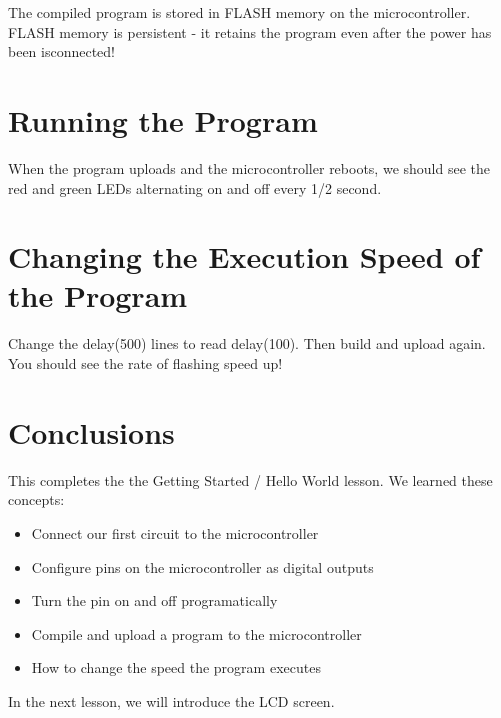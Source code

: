 \documentclass{article}
\begin{document}
The compiled program is stored in FLASH memory on the microcontroller.  FLASH 
memory is persistent - it retains the program even after the power has been 
isconnected!

\vspace{3mm}

\section*{Running the Program}

When the program uploads and the microcontroller reboots, we should see the red 
and green LEDs alternating on and off every 1/2 second.

\vspace{3mm}

\section*{Changing the Execution Speed of the Program}

Change the delay(500) lines to read delay(100).  Then build and upload again.
You should see the rate of flashing speed up!

\newpage

\section*{Conclusions}
This completes the the Getting Started / Hello World lesson.  We learned these concepts:

\begin{itemize}
    \item Connect our first circuit to the microcontroller
    \item Configure pins on the microcontroller as digital outputs
    \item Turn the pin on and off programatically
    \item Compile and upload a program to the microcontroller
    \item How to change the speed the program executes
\end{itemize}
\vspace{3mm}

In the next lesson, we will introduce the LCD screen.
\end{document}
